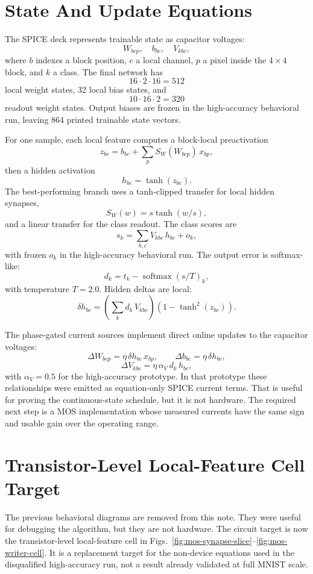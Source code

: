\documentclass[11pt]{article}
\begin{document}
\section{State And Update Equations}

The SPICE deck represents trainable state as capacitor voltages:
\[
  W_{bcp},\quad b_{bc},\quad V_{kbc},
\]
where \(b\) indexes a block position, \(c\) a local channel, \(p\) a pixel
inside the \(4\times4\) block, and \(k\) a class.  The final network has
\[
  16\cdot2\cdot16 = 512
\]
local weight states, 32 local bias states, and
\[
  10\cdot16\cdot2 = 320
\]
readout weight states.  Output biases are frozen in the high-accuracy
behavioral run, leaving 864 printed trainable state vectors.

For one sample, each local feature computes a block-local preactivation
\[
  z_{bc} = b_{bc} + \sum_p S_W(W_{bcp})\,x_{bp},
\]
then a hidden activation
\[
  h_{bc} = \tanh(z_{bc}).
\]
The best-performing branch uses a tanh-clipped transfer for local hidden
synapses,
\[
  S_W(w) = s \tanh(w/s),
\]
and a linear transfer for the class readout.  The class scores are
\[
  s_k = \sum_{b,c} V_{kbc}\,h_{bc} + o_k,
\]
with frozen \(o_k\) in the high-accuracy behavioral run.  The output error is
softmax-like:
\[
  d_k = t_k - \operatorname{softmax}(s/T)_k,
\]
with temperature \(T=2.0\).  Hidden deltas are local:
\[
  \delta h_{bc}
  =
  \left(\sum_k d_k\,V_{kbc}\right)
  (1-\tanh^2(z_{bc})).
\]

The phase-gated current sources implement direct online updates to the
capacitor voltages:
\[
  \Delta W_{bcp} = \eta\,\delta h_{bc}\,x_{bp},\qquad
  \Delta b_{bc} = \eta\,\delta h_{bc},
\]
\[
  \Delta V_{kbc} = \eta\,\alpha_V\,d_k\,h_{bc},
\]
with \(\alpha_V=0.5\) for the high-accuracy prototype.  In that prototype these
relationships were emitted as equation-only SPICE current terms.  That is useful
for proving the continuous-state schedule, but it is not hardware.  The required
next step is a MOS implementation whose measured currents have the same sign and
usable gain over the operating range.


\section{Transistor-Level Local-Feature Cell Target}

The previous behavioral diagrams are removed from this note.  They were useful
for debugging the algorithm, but they are not hardware.  The circuit target is
now the transistor-level local-feature cell in
Figs.~\ref{fig:mos-synapse-slice}--\ref{fig:mos-writer-cell}.  It is a replacement target for the
non-device equations used in the disqualified high-accuracy run, not a result
already validated at full MNIST scale.
\end{document}
